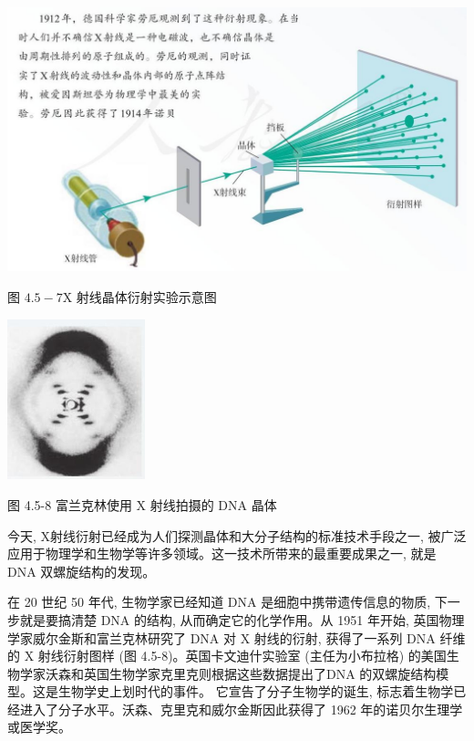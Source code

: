 \documentclass[10pt]{article}
\begin{document}
\begin{center}
\includegraphics[max width=1.0\textwidth]{images/01910e4c-ebb8-7d2c-8f2f-2375bc1d2d12_111_985517.jpg}
\end{center}

图 \({4.5} - 7\mathrm{X}\) 射线晶体衍射实验示意图

\begin{center}
\includegraphics[max width=0.3\textwidth]{images/01910e4c-ebb8-7d2c-8f2f-2375bc1d2d12_112_290574.jpg}
\end{center}

图 4.5-8 富兰克林使用 \(\mathrm{X}\) 射线拍摄的 DNA 晶体

今天, X射线衍射已经成为人们探测晶体和大分子结构的标准技术手段之一, 被广泛应用于物理学和生物学等许多领域。这一技术所带来的最重要成果之一, 就是 DNA 双螺旋结构的发现。

在 20 世纪 50 年代, 生物学家已经知道 DNA 是细胞中携带遗传信息的物质, 下一步就是要搞清楚 DNA 的结构, 从而确定它的化学作用。从 1951 年开始, 英国物理学家威尔金斯和富兰克林研究了 DNA 对 X 射线的衍射, 获得了一系列 DNA 纤维的 X 射线衍射图样 (图 4.5-8)。英国卡文迪什实验室 (主任为小布拉格) 的美国生物学家沃森和英国生物学家克里克则根据这些数据提出了DNA 的双螺旋结构模型。这是生物学史上划时代的事件。 它宣告了分子生物学的诞生, 标志着生物学已经进入了分子水平。沃森、克里克和威尔金斯因此获得了 1962 年的诺贝尔生理学或医学奖。
\end{document}
